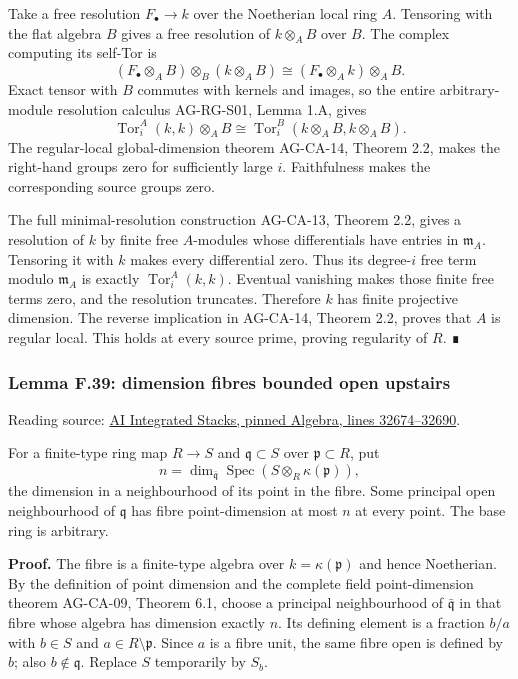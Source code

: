 \documentclass[11pt,a4paper,openany]{report}
\begin{document}
Take a free resolution \(F_\bullet\to k\) over the Noetherian local ring \(A\). Tensoring with the flat algebra \(B\) gives a free resolution of \(k\otimes_AB\) over \(B\). The complex computing its self-Tor is \[(F_\bullet\otimes_AB)\otimes_B(k\otimes_AB)
\cong(F_\bullet\otimes_Ak)\otimes_AB.\] Exact tensor with \(B\) commutes with kernels and images, so the entire arbitrary-module resolution calculus AG-RG-S01, Lemma 1.A, gives \[\operatorname{Tor}_i^A(k,k)\otimes_AB
\cong\operatorname{Tor}_i^B(k\otimes_AB,k\otimes_AB).\] The regular-local global-dimension theorem AG-CA-14, Theorem 2.2, makes the right-hand groups zero for sufficiently large \(i\). Faithfulness makes the corresponding source groups zero.

The full minimal-resolution construction AG-CA-13, Theorem 2.2, gives a resolution of \(k\) by finite free \(A\)-modules whose differentials have entries in \(\mathfrak m_A\). Tensoring it with \(k\) makes every differential zero. Thus its degree-\(i\) free term modulo \(\mathfrak m_A\) is exactly \(\operatorname{Tor}_i^A(k,k)\). Eventual vanishing makes those finite free terms zero, and the resolution truncates. Therefore \(k\) has finite projective dimension. The reverse implication in AG-CA-14, Theorem 2.2, proves that \(A\) is regular local. This holds at every source prime, proving regularity of \(R\). ∎

\label{AG-RG-S05-algebra-lemma-dimension-fibres-bounded-open-upstairs}

\subsubsection{Lemma F.39: dimension fibres bounded open upstairs}\label{AG-RG-S05-lemma-f.39-dimension-fibres-bounded-open-upstairs}

Reading source: \href{https://github.com/KokunoYumeto/unofficial-stacks-project-ai-drafts/blob/565b10e987aba5969b21145a0833f42d69f96790/algebra.tex\#L32674-L32690}{AI Integrated Stacks, pinned Algebra, lines 32674--32690}.

For a finite-type ring map \(R\to S\) and \(\mathfrak q\subset S\) over \(\mathfrak p\subset R\), put \[n=\dim_{\bar{\mathfrak q}}\operatorname{Spec}
(S\otimes_R\kappa(\mathfrak p)),\] the dimension in a neighbourhood of its point in the fibre. Some principal open neighbourhood of \(\mathfrak q\) has fibre point-dimension at most \(n\) at every point. The base ring is arbitrary.

\textbf{Proof.} The fibre is a finite-type algebra over \(k=\kappa(\mathfrak p)\) and hence Noetherian. By the definition of point dimension and the complete field point-dimension theorem AG-CA-09, Theorem 6.1, choose a principal neighbourhood of \(\bar{\mathfrak q}\) in that fibre whose algebra has dimension exactly \(n\). Its defining element is a fraction \(b/a\) with \(b\in S\) and \(a\in R\setminus\mathfrak p\). Since \(a\) is a fibre unit, the same fibre open is defined by \(b\); also \(b\notin\mathfrak q\). Replace \(S\) temporarily by \(S_b\).
\end{document}
